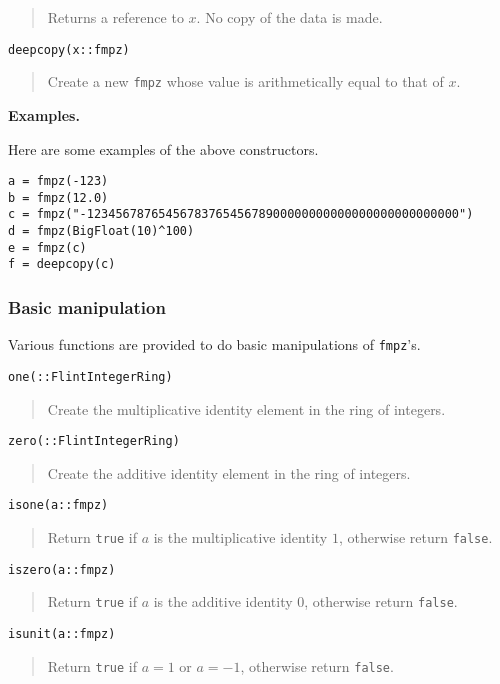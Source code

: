 \documentclass[a4paper,10pt]{article}
\newcommand{\code}{\lstinline}
\newcommand{\desc}[1]{\vspace{-3mm}\begin{quote}#1\end{quote}}
\begin{document}
\desc{Returns a reference to $x$. No copy of the data is made.}

\begin{lstlisting}
deepcopy(x::fmpz)
\end{lstlisting}

\desc{Create a new \code{fmpz} whose value is arithmetically equal to that of $x$.}

\textbf{Examples.}

Here are some examples of the above constructors.

\begin{lstlisting}
a = fmpz(-123)
b = fmpz(12.0)
c = fmpz("-1234567876545678376545678900000000000000000000000000")
d = fmpz(BigFloat(10)^100)
e = fmpz(c)
f = deepcopy(c)
\end{lstlisting}

\subsubsection{Basic manipulation}

Various functions are provided to do basic manipulations of \code{fmpz}'s.

\begin{lstlisting}
one(::FlintIntegerRing)
\end{lstlisting}

\desc{Create the multiplicative identity element in the ring of integers.}

\begin{lstlisting}
zero(::FlintIntegerRing)
\end{lstlisting}

\desc{Create the additive identity element in the ring of integers.}

\begin{lstlisting}
isone(a::fmpz)
\end{lstlisting}

\desc{Return \code{true} if $a$ is the multiplicative identity $1$, otherwise
return \code{false}.}

\begin{lstlisting}
iszero(a::fmpz)
\end{lstlisting}

\desc{Return \code{true} if $a$ is the additive identity $0$, otherwise
return \code{false}.}

\begin{lstlisting}
isunit(a::fmpz)
\end{lstlisting}

\desc{Return \code{true} if $a = 1$ or $a = -1$, otherwise return \code{false}.}
\end{document}
